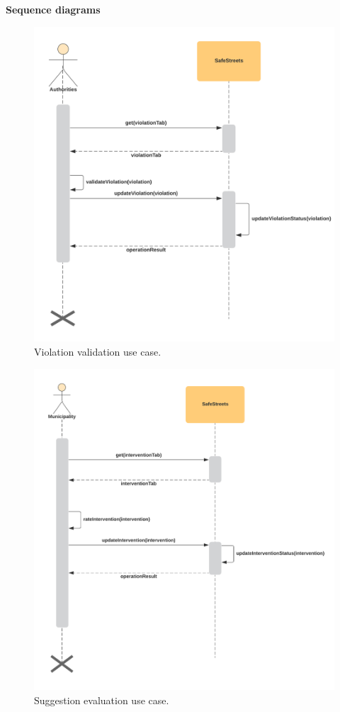 \newpage
\textbf{Sequence diagrams}
\begin{figure}[H]
	\centering
	\includegraphics[width=\linewidth]{Images/UML/ViolationValidationUseCase}
	\caption{Violation validation use case.}
\end{figure}
\begin{figure}[H]
	\centering
	\includegraphics[width=\linewidth]{Images/UML/SuggestionEvaluationUseCase}
	\caption{Suggestion evaluation use case.}
\end{figure}
